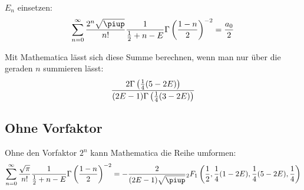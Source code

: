 $E_n$ einsetzen:
\[
    \sum_{n=0}^\infty \frac{2^n \sqrt\piup}{n!} \frac{1}{\frac 12 + n -
    E} \Gamma\del{\frac{1-n}2}^{-2} = \frac{a_0}2
\]

Mit Mathematica lässt sich diese Summe berechnen, wenn man nur über die geraden
$n$ summieren lässt:
\[
    \frac{2 \Gamma\del{\frac 14(5-2E)}}{(2E-1)\Gamma\del{\frac 14(3-2E)}}
\]

\subsection{Ohne Vorfaktor}

Ohne den Vorfaktor $2^n$ kann Mathematica die Reihe umformen:
\[
    \sum_{n=0}^\infty \frac{\sqrt\pi}{n!} \frac{1}{\frac 12 + n -
    E} \Gamma\del{\frac{1-n}2}^{-2} = - \frac{2}{(2E-1)\sqrt\piup}
    {_2F_1}\del{\frac 12, \frac 14(1-2E), \frac 14(5-2E), \frac 14}
\]

